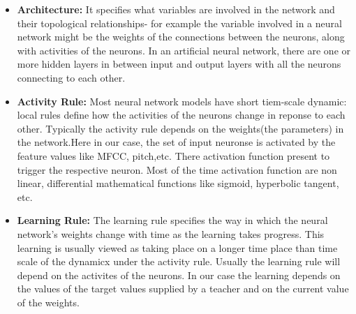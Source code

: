 \begin{itemize}
        \item \textbf{Architecture:} 
                It specifies what variables are involved in the network and their topological relationships- for example the variable involved
                in a neural network might be the weights of the connections between the neurons, along with activities of the neurons. In an artificial
                neural network, there are one or more hidden layers in between input and output layers with all the neurons connecting to each other.
        \item \textbf{Activity Rule:}
                Most neural network models have short tiem-scale dynamic: local rules define how the activities of the neurons change in reponse to each other.
                Typically the activity rule depends on the weights(the parameters) in the network.Here in our case, the set of input neuronse
                is activated by the feature values like MFCC, pitch,etc. There activation function present to trigger the respective neuron. Most of the time
                activation function are non linear, differential mathematical functions like sigmoid, hyperbolic tangent, etc.
        \item \textbf{Learning Rule:}
                The learning rule specifies the way in which the neural network's weights change with time as the learning takes progress. This learning is usually viewed as 
                taking place on a longer time place than time scale of the dynamicx under the activity rule. Usually the learning rule will depend on the activites of the 
                neurons. In our case the learning depends on the values of the target values supplied by a teacher and on the current value of the weights.
\end{itemize}

